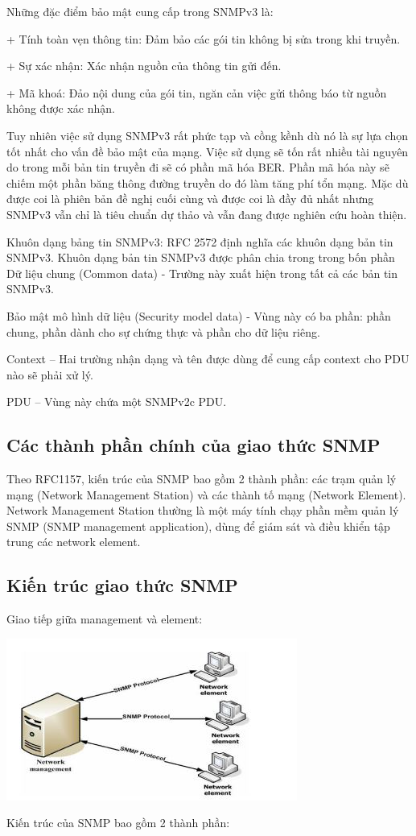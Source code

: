 \documentclass[12pt,oneside,a4paper,reqno]{report}
\begin{document}
\begin{large}
Những đặc điểm bảo mật cung cấp trong SNMPv3 là:

+ Tính toàn vẹn thông tin: Đảm bảo các gói tin không bị sửa trong khi truyền. 

+ Sự xác nhận: Xác nhận nguồn của thông tin gửi đến. 

+ Mã khoá: Đảo nội dung của gói tin, ngăn cản việc gửi thông báo từ nguồn không được xác nhận. 

Tuy nhiên việc sử dụng SNMPv3 rất phức tạp và cồng kềnh dù nó là sự lựa chọn tốt nhất cho vấn đề bảo mật của mạng. Việc sử dụng sẽ tốn rất nhiều tài nguyên do trong mỗi bản tin truyền đi sẽ có phần mã hóa BER. Phần mã hóa này sẽ chiếm một phần băng thông đường truyền do đó làm tăng phí tổn mạng. Mặc dù được coi là phiên bản đề nghị cuối cùng và được coi là đầy đủ nhất nhưng SNMPv3 vẫn chỉ là tiêu chuẩn dự thảo và vẫn đang được nghiên cứu hoàn thiện. 

Khuôn dạng bảng tin SNMPv3: RFC 2572 định nghĩa các khuôn dạng bản tin SNMPv3. Khuôn dạng bản tin SNMPv3 được phân chia trong trong bốn phần Dữ liệu chung (Common data) - Trường này xuất hiện trong tất cả các bản tin SNMPv3. 

Bảo mật mô hình dữ liệu (Security model data) - Vùng này có ba phần: phần chung, phần dành cho sự chứng thực và phần cho dữ liệu riêng. 

Context – Hai trường nhận dạng và tên được dùng để cung cấp context cho PDU nào sẽ phải xử lý. 

PDU – Vùng này chứa một SNMPv2c PDU. 

\subsection{Các thành phần chính của giao thức SNMP}
Theo RFC1157, kiến trúc của SNMP bao gồm 2 thành phần: các trạm quản lý mạng (Network Management Station) và các thành tố mạng (Network Element). Network Management Station thường là một máy tính chạy phần mềm quản lý SNMP (SNMP management application), dùng để giám sát và điều khiển tập trung các network element.
\subsection{Kiến trúc giao thức SNMP}

 Giao tiếp giữa management và element:
\begin{center}
	\includegraphics[scale=1]{images/kientrucsnmp.jpg}
\end{center}
Kiến trúc của SNMP bao gồm 2 thành phần:


\end{large}
\end{document}
